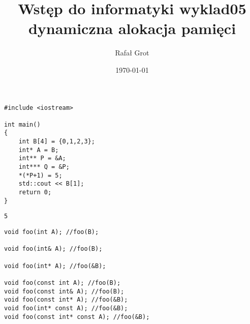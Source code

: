 \documentclass[11pt]{article}
\author{Rafał Grot}
\date{\today}
\title{Wstęp do informatyki wyklad05 dynamiczna alokacja pamięci}
\begin{document}
\maketitle
\tableofcontents

\begin{verbatim}
#include <iostream>

int main()
{
    int B[4] = {0,1,2,3};
    int* A = B;
    int** P = &A;
    int*** Q = &P;
    *(*P+1) = 5;
    std::cout << B[1];
    return 0;
}
\end{verbatim}

\begin{verbatim}
5
\end{verbatim}


\begin{verbatim}
void foo(int A); //foo(B);

void foo(int& A); //foo(B);

void foo(int* A); //foo(&B);

void foo(const int A); //foo(B);
void foo(const int& A); //foo(B);
void foo(const int* A); //foo(&B);
void foo(int* const A); //foo(&B);
void foo(const int* const A); //foo(&B);
\end{verbatim}
\end{document}
